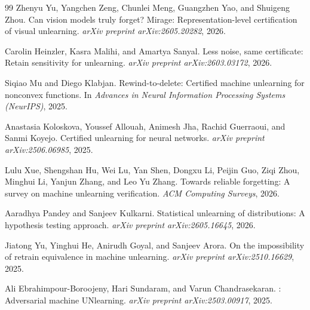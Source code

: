 \documentclass[11pt]{article}
\begin{document}
\begin{thebibliography}{99}
Zhenyu Yu, Yangchen Zeng, Chunlei Meng, Guangzhen Yao, and Shuigeng Zhou.
\newblock Can vision models truly forget? {Mirage}: Representation-level certification of visual unlearning.
\newblock \emph{arXiv preprint arXiv:2605.20282}, 2026.

Carolin Heinzler, Kasra Malihi, and Amartya Sanyal.
\newblock Less noise, same certificate: Retain sensitivity for unlearning.
\newblock \emph{arXiv preprint arXiv:2603.03172}, 2026.

Siqiao Mu and Diego Klabjan.
\newblock Rewind-to-delete: Certified machine unlearning for nonconvex functions.
\newblock In \emph{Advances in Neural Information Processing Systems (NeurIPS)}, 2025.

Anastasia Koloskova, Youssef Allouah, Animesh Jha, Rachid Guerraoui, and Sanmi Koyejo.
\newblock Certified unlearning for neural networks.
\newblock \emph{arXiv preprint arXiv:2506.06985}, 2025.

Lulu Xue, Shengshan Hu, Wei Lu, Yan Shen, Dongxu Li, Peijin Guo, Ziqi Zhou, Minghui Li, Yanjun Zhang, and Leo Yu Zhang.
\newblock Towards reliable forgetting: A survey on machine unlearning verification.
\newblock \emph{ACM Computing Surveys}, 2026.

Aaradhya Pandey and Sanjeev Kulkarni.
\newblock Statistical unlearning of distributions: A hypothesis testing approach.
\newblock \emph{arXiv preprint arXiv:2605.16645}, 2026.

Jiatong Yu, Yinghui He, Anirudh Goyal, and Sanjeev Arora.
\newblock On the impossibility of retrain equivalence in machine unlearning.
\newblock \emph{arXiv preprint arXiv:2510.16629}, 2025.

Ali Ebrahimpour-Boroojeny, Hari Sundaram, and Varun Chandrasekaran.
: Adversarial machine UNlearning.
\newblock \emph{arXiv preprint arXiv:2503.00917}, 2025.

\end{thebibliography}
\end{document}
